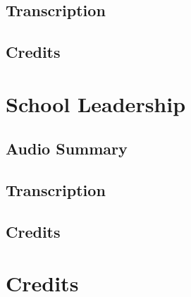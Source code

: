 \subsection{Transcription}

\subsection{Credits}

\section{School Leadership}

\subsection{Audio Summary}

\subsection{Transcription}

\subsection{Credits}

\section{Credits}